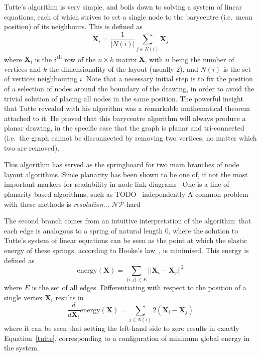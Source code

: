 Tutte's algorithm is very simple, and boils down to solving a system of linear equations, each of which strives to set a single node to the barycentre (i.e.\ mean position) of its neighbours. This is defined as 
\begin{equation}
    \mathbf{X}_i = \frac{1}{|N(i)|}\sum_{j\in N(i)}\mathbf{X}_j
\label{tutte}
\end{equation}
where $\mathbf{X}_i$ is the $i$\textsuperscript{th} row of the $n\times k$ matrix $\mathbf{X}$, with $n$ being the number of vertices and $k$ the dimensionality of the layout (usually $2$), and $N(i)$ is the set of vertices neighbouring $i$.
Note that a necessary initial step is to fix the position of a selection of nodes around the boundary of the drawing, in order to avoid the trivial solution of placing all nodes in the same position.
The powerful insight that Tutte revealed with his algorithm was a remarkable mathematical theorem attached to it. He proved that this barycentre algorithm will always produce a planar drawing, in the specific case that the graph is planar and tri-connected (i.e.\ the graph cannot be disconnected by removing two vertices, no matter which two are removed).

This algorithm has served as the springboard for two main branches of node layout algorithms. Since planarity has been shown to be one of, if not the most important markers for readability in node-link diagrams~\cite{todo} One is a line of planarity based algorithms, such as TODO~\cite{deFraysseix-Pach-Pollack} \cite{Chrobak} independently \cite{Schnyder}
A common problem with these methods is \emph{resolution}...
$\mathcal{NP}$-hard

The second branch comes from an intuitive interpretation of the algorithm: that each edge is analogous to a spring of natural length 0, where the solution to Tutte's system of linear equations can be seen as the point at which the elastic energy of these springs, according to Hooke's law~\cite{hooke}, is minimised. This energy is defined as
\begin{equation}
    \mathrm{energy}(\mathbf{X}) = \sum_{\{i,j\}\in E}||\mathbf{X}_i-\mathbf{X}_j||^2
\label{tutte_energy}
\end{equation}
where $E$ is the set of all edges. Differentiating with respect to the position of a single vertex $\mathbf{X}_i$ results in
\begin{equation}
    \frac{d}{d\mathbf{X}_i}\mathrm{energy}(\mathbf{X}) = \sum_{j\in N(i)}2(\mathbf{X}_i-\mathbf{X}_j)
\label{tutte_force}
\end{equation}
where it can be seen that setting the left-hand side to zero results in exactly Equation~\eqref{tutte}, corresponding to a configuration of minimum global energy in the system.


